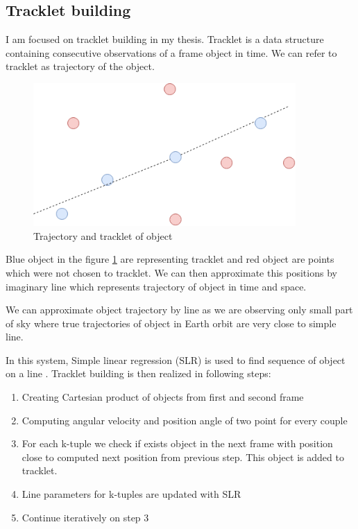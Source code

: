\subsection{Tracklet building}

I am focused on tracklet building in my thesis. Tracklet is a data structure containing consecutive observations of a frame object in time. We can refer to tracklet as trajectory of the object. 

\begin{figure}[h!]
    \centering
    \includegraphics[width=100mm]{chapters/images/trajectory_img.png}
    \caption{Trajectory and tracklet of object}
    \label{fig:TB_trajectory}
\end{figure}

Blue object in the figure \ref{fig:TB_trajectory} are representing tracklet and red object are points which were not chosen to tracklet. We can then approximate this positions by imaginary line which represents trajectory of object in time and space.

We can approximate object trajectory by line as we are observing only small part of sky where true trajectories of object in Earth orbit are very close to simple line. 

In this system, Simple linear regression (SLR)  is used to find sequence of object on a line \cite{krajvcovivc2019selected}. Tracklet building is then realized in following steps:
\begin{enumerate}
    \item Creating Cartesian product of objects from first and second frame
    \item Computing angular velocity and position angle of two point for every couple
    \item For each k-tuple we check if exists object in the next frame with position close to computed next position from previous step. This object is added to tracklet.
    \item Line parameters for k-tuples are updated with SLR
    \item Continue iteratively on step 3
\end{enumerate}

